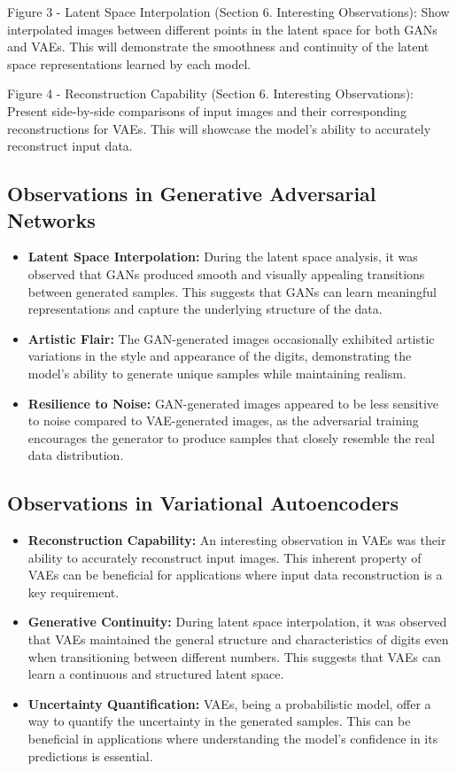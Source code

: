 \documentclass{article}
\begin{document}
Figure 3 - Latent Space Interpolation (Section 6. Interesting Observations): Show interpolated images between different points in the latent space for both GANs and VAEs. This will demonstrate the smoothness and continuity of the latent space representations learned by each model.

Figure 4 - Reconstruction Capability (Section 6. Interesting Observations): Present side-by-side comparisons of input images and their corresponding reconstructions for VAEs. This will showcase the model's ability to accurately reconstruct input data.

\subsection{Observations in Generative Adversarial Networks}
\begin{itemize}
    \item \textbf{Latent Space Interpolation:} During the latent space analysis, it was observed that GANs produced smooth and visually appealing transitions between generated samples. This suggests that GANs can learn meaningful representations and capture the underlying structure of the data.
    \item \textbf{Artistic Flair:} The GAN-generated images occasionally exhibited artistic variations in the style and appearance of the digits, demonstrating the model's ability to generate unique samples while maintaining realism.
    \item \textbf{Resilience to Noise:} GAN-generated images appeared to be less sensitive to noise compared to VAE-generated images, as the adversarial training encourages the generator to produce samples that closely resemble the real data distribution.
\end{itemize}

\subsection{Observations in Variational Autoencoders}
\begin{itemize}
    \item \textbf{Reconstruction Capability:} An interesting observation in VAEs was their ability to accurately reconstruct input images. This inherent property of VAEs can be beneficial for applications where input data reconstruction is a key requirement.
    \item \textbf{Generative Continuity:} During latent space interpolation, it was observed that VAEs maintained the general structure and characteristics of digits even when transitioning between different numbers. This suggests that VAEs can learn a continuous and structured latent space.
    \item \textbf{Uncertainty Quantification:} VAEs, being a probabilistic model, offer a way to quantify the uncertainty in the generated samples. This can be beneficial in applications where understanding the model's confidence in its predictions is essential.
\end{itemize}
\end{document}
